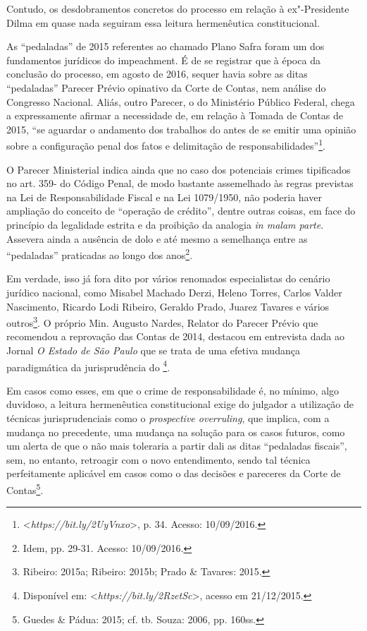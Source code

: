 Contudo, os desdobramentos concretos do processo em relação à
ex"-Presidente Dilma em quase nada seguiram essa leitura hermenêutica
constitucional.

As ``pedaladas'' de 2015 referentes ao chamado Plano Safra foram um dos
fundamentos jurídicos do impeachment. É de se registrar que à
época da conclusão do processo, em agosto de 2016, sequer havia sobre as
ditas ``pedaladas'' Parecer Prévio opinativo da Corte de Contas, nem
análise do Congresso Nacional. Aliás, outro Parecer, o do Ministério
Público Federal, chega a expressamente afirmar a necessidade de, em
relação à Tomada de Contas de 2015, ``se aguardar o andamento dos
trabalhos do  antes de se emitir uma opinião sobre a configuração
penal dos fatos e delimitação de responsabilidades''\footnote{\textless{}\emph{https://bit.ly/2UyVnxo}\textgreater{}, p. 34. Acesso: 10/09/2016.}.

O Parecer Ministerial indica ainda que no caso dos potenciais crimes
tipificados no art. 359- do Código Penal, de modo bastante assemelhado
às regras previstas na Lei de Responsabilidade Fiscal e na Lei
1079/1950, não poderia haver ampliação do conceito de ``operação de
crédito'', dentre outras coisas, em face do princípio da legalidade
estrita e da proibição da analogia \emph{in malam parte}. Assevera ainda
a ausência de dolo e até mesmo a semelhança entre as ``pedaladas''
praticadas ao longo dos anos\footnote{Idem, pp. 29-31. Acesso: 10/09/2016.}.

Em verdade, isso já fora dito por vários renomados especialistas do
cenário jurídico nacional, como Misabel Machado Derzi, Heleno Torres,
Carlos Valder Nascimento, Ricardo Lodi Ribeiro, Geraldo Prado, Juarez
Tavares e vários outros\footnote{Ribeiro: 2015a; Ribeiro: 2015b; Prado \&
Tavares: 2015.}. O próprio Min. Augusto Nardes, Relator do Parecer Prévio
que recomendou a reprovação das Contas de 2014, destacou em entrevista
dada ao Jornal \emph{O Estado de São Paulo} que se trata de uma efetiva
mudança paradigmática da jurisprudência do \footnote{Disponível em: \textless{}\emph{https://bit.ly/2RzetSc}\textgreater{}, acesso em 21/12/2015.}.

Em casos como esses, em que o crime de responsabilidade é, no mínimo,
algo duvidoso, a leitura hermenêutica constitucional exige do julgador a
utilização de técnicas jurisprudenciais como o \emph{prospective
overruling}, que implica, com a mudança no precedente, uma mudança na
solução para os casos futuros, como um alerta de que o  não mais
toleraria a partir dali as ditas ``pedaladas fiscais'', sem, no entanto,
retroagir com o novo entendimento, sendo tal técnica perfeitamente
aplicável em casos como o das decisões e pareceres da Corte de Contas\footnote{Guedes \& Pádua: 2015; cf. tb. Souza: 2006, pp. 160ss.}.

